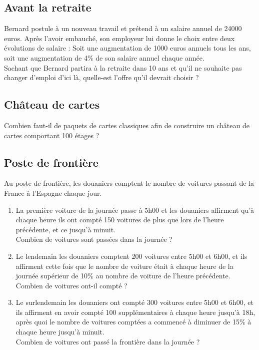 \documentclass[oneside,12pt]{article}          %
\begin{document}
\subsection{Avant la retraite}
Bernard postule à un nouveau travail et prétend à un salaire annuel de 24000 euros. Après l'avoir embauché, son employeur lui donne le choix entre deux évolutions de salaire : Soit une augmentation de 1000 euros annuels tous les ans, soit une augmentation de 4$\%$ de son salaire annuel chaque année. \\
Sachant que Bernard partira à la retraite dans 10 ans et qu'il ne souhaite pas changer d'emploi d'ici là, quelle-est l'offre qu'il devrait choisir ?



\subsection{Château de cartes}
Combien faut-il de paquets de cartes classiques afin de construire un château de cartes comportant 100 étages ?



\subsection{Poste de frontière}
Au poste de frontière, les douaniers comptent le nombre de voitures passant de la France à l'Espagne chaque jour.
\begin{enumerate}
	\item La première voiture de la journée passe à 5h00 et les douaniers affirment qu'à chaque heure ils ont compté 150 voitures de plus que lors de l'heure précédente, et ce jusqu'à minuit.\\
	Combien de voitures sont passées dans la journée ?
	\item Le lendemain les douaniers comptent 200 voitures entre 5h00 et 6h00, et ils affirment cette fois que le nombre de voiture était à chaque heure de la journée supérieur de 10\% au nombre de voiture de l'heure précédente.\\
	Combien de voitures ont-il compté ?
	\item Le surlendemain les douaniers ont compté 300 voitures entre 5h00 et 6h00, et ils affirment en avoir compté 100 supplémentaires à chaque heure jusqu'à 18h, après quoi le nombre de voitures comptées a commencé à diminuer de 15\% à chaque heure jusqu'à minuit.\\
	Combien de voitures ont passé la frontière dans la journée ?
\end{enumerate}
\end{document}
